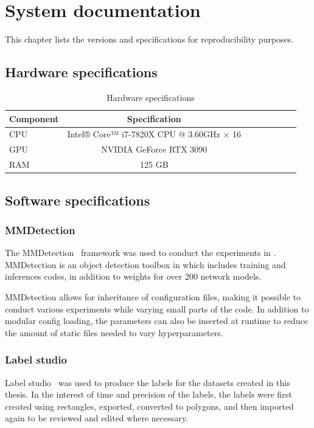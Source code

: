\documentclass[oneside, english, bibtex]{kththesis}
\begin{document}
\section{System documentation}
\label{sec:sysdoc}

This chapter lists the versions and specifications for reproducibility purposes.

\subsection{Hardware specifications}

\begin{table}[!ht]
  \begin{center}
    \caption{Hardware specifications}
        \begin{tabular}{l*{6}{c}r}
        \label{tab:hardwarestats}
        \textbf{Component} & \textbf{Specification} & \\
        \hline
        CPU & Intel® Core™ i7-7820X CPU @ 3.60GHz × 16 & \\
        GPU & NVIDIA GeForce RTX 3090 & \\
        RAM & 125 GB \\
        \end{tabular}
  \end{center}
\end{table}


\subsection{Software specifications}

\subsubsection{MMDetection}
The MMDetection~\cite{DBLP:journals/corr/abs-1906-07155} framework was used to conduct the experiments in .
MMDetection is an object detection toolbox in which includes training and inferences codes, in addition to weights for over 200 network models.

MMDetection allows for inheritance of configuration files, making it possible to conduct various experiments while varying small parts of the code.
In addition to modular config loading, the parameters can also be inserted at runtime to reduce the amount of static files needed to vary hyperparameters.

\subsubsection{Label studio}
Label studio~\cite{Label_Studio} was used to produce the labels for the datasets created in this thesis. In the interest of time and precision of the labels, the labels were first created using rectangles, exported, converted to polygons, and then imported again to be reviewed and edited where necessary. 
\end{document}

